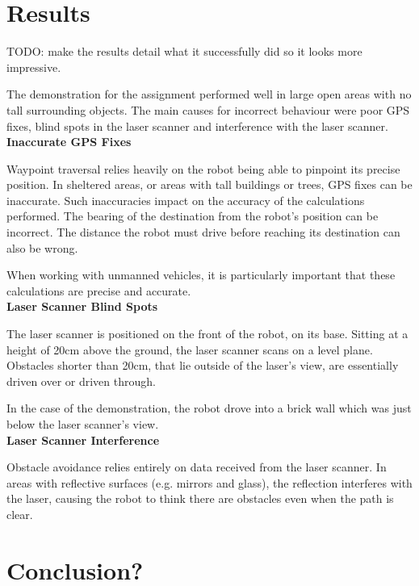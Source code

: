 \documentclass[titlepage,12pt,a4paper]{article}
\begin{document}
\pagebreak
\section{Results}

TODO: make the results detail what it successfully did so it looks more impressive.

The demonstration for the assignment performed well in large open areas with no tall surrounding objects. The main causes for incorrect behaviour were poor GPS fixes, blind spots in the laser scanner and interference with the laser scanner. \\

\textbf{Inaccurate GPS Fixes}

Waypoint traversal relies heavily on the robot being able to pinpoint its precise position. In sheltered areas, or areas with tall buildings or trees, GPS fixes can be inaccurate. Such inaccuracies impact on the accuracy of the calculations performed. The bearing of the destination from the robot's position can be incorrect. The distance the robot must drive before reaching its destination can also be wrong. 

When working with unmanned vehicles, it is particularly important that these calculations are precise and accurate. \\

\textbf{Laser Scanner Blind Spots}

The laser scanner is positioned on the front of the robot, on its base. Sitting at a height of 20cm above the ground, the laser scanner scans on a level plane. Obstacles shorter than 20cm, that lie outside of the laser's view, are essentially driven over or driven through. 

In the case of the demonstration, the robot drove into a brick wall which was just below the laser scanner's view. \\

\textbf{Laser Scanner Interference}

Obstacle avoidance relies entirely on data received from the laser scanner. In areas with reflective surfaces (e.g. mirrors and glass), the reflection interferes with the laser, causing the robot to think there are obstacles even when the path is clear.

\pagebreak
\section{Conclusion?}
\end{document}
